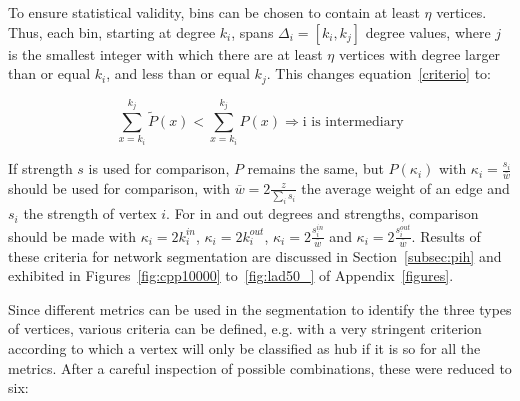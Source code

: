 \documentclass[%
 aip,
 jmp,%
 amsmath,amssymb,
 reprint,%
]{revtex4-1}
\begin{document}
To ensure statistical validity, bins can be chosen to contain at least $\eta$ vertices. Thus, each bin, starting at degree $k_i$, spans $\Delta_i=[k_{i},k_{j}]$ degree values, where $j$ is the smallest integer with which there are at least $\eta$ vertices with degree larger than or equal $k_i$, and less than or equal $k_{j}$. This changes equation~\ref{criterio} to:

\begin{equation}\label{criterio2}
    \sum_{x=k_i}^{k_j} \widetilde{P}(x) < \sum_{x=k_i}^{k_j} P(x) \Rightarrow \text{i is intermediary}
\end{equation}

If strength $s$ is used for comparison, $P$ remains the same, but $P(\kappa_i)$ with $\kappa_i=\frac{s_i}{\overline{w}}$ should be used for comparison, with $\overline{w}=2\frac{z}{\sum_is_i}$ the average weight of an edge and $s_i$ the strength of vertex $i$. For in and out degrees and strengths, comparison should be made with $\kappa_i=2k_i^{in}$, $\kappa_i=2k_i^{out}$, $\kappa_i=2\frac{s_i^{in}}{\overline{w}}$ and $\kappa_i=2\frac{s_i^{out}}{\overline{w}}$. Results of these criteria for network segmentation are discussed in Section~\ref{subsec:pih} and exhibited in Figures~\ref{fig:cpp10000} to~\ref{fig:lad50_} of Appendix~\ref{figures}.

Since different metrics can be used in the segmentation to identify the three types of vertices, various criteria can be defined, e.g. with a very stringent criterion according to which a vertex will only be classified as hub if it is so for all the metrics. After a careful inspection of possible combinations, these were reduced to six:
\end{document}
